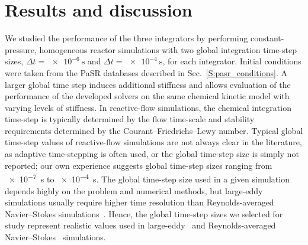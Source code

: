 \documentclass[preprint,review,11pt]{elsarticle}
\begin{document}
\section{Results and discussion}
\label{S:results}

We studied the performance of the three integrators by performing constant-pressure, homogeneous reactor simulations with two global integration time-step sizes, $\Delta t = \SI{e-6}{\s}$ and $\Delta t = \SI{e-4}{\s}$, for each integrator. Initial conditions were taken from the PaSR databases described in Sec.~\ref{S:pasr_conditions}.
A larger global time step induces additional stiffness and allows evaluation of the performance of the developed solvers on the same chemical kinetic model with varying levels of stiffness.
In reactive-flow simulations, the chemical integration time-step is typically determined by the flow time-scale and stability requirements determined by the Courant--Friedrichs--Lewy number.
Typical global time-step values of reactive-flow simulations are not always clear in the literature, as adaptive time-stepping is often used, or the global time-step size is simply not reported; our own experience suggests global time-step sizes ranging from \SI{e-7}{\s} to \SI{e-4}{\s}.
The global time-step size used in a given simulation depends highly on the problem and numerical methods, but large-eddy simulations usually require higher time resolution than Reynolds-averaged Navier--Stokes simulations~\cite{Iaccarino:2003147}.
Hence, the global time-step sizes we selected for study represent realistic values used in large-eddy~\cite{Wang20111319,Bulat20133155} and Reynolds-averaged Navier--Stokes~\cite{Ramirez2010,Galloni20091131} simulations.
\end{document}
